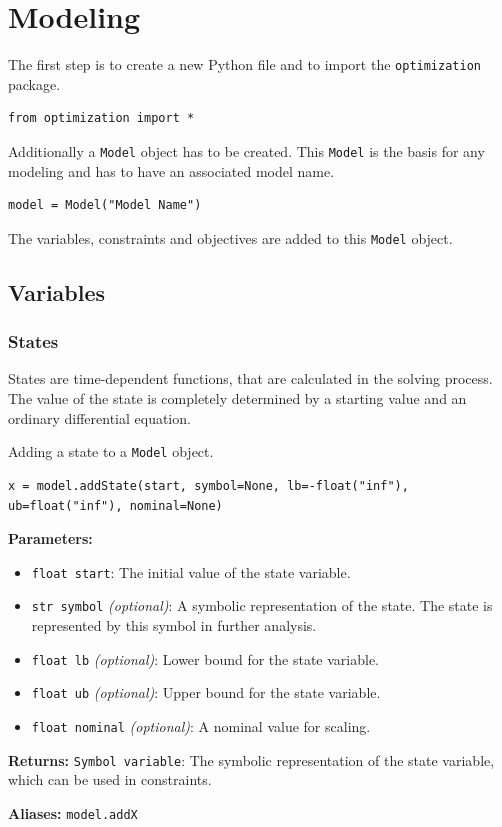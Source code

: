 \documentclass[12pt]{article}
\begin{document}
\section{Modeling}

The first step is to create a new Python file and to import the
\texttt{optimization} package.
\begin{lstlisting}
from optimization import *
	\end{lstlisting}

Additionally a \texttt{Model} object has to be created. This
\texttt{Model} is the basis for any modeling and has to have an associated
model name.
\begin{lstlisting}
model = Model("Model Name")
	\end{lstlisting}

The variables, constraints and objectives are added to this
\texttt{Model} object.

\subsection{Variables}

\subsubsection{States}

States are time-dependent functions, that are calculated in the
solving process. The value of the state is completely determined by a starting
value and an ordinary differential equation.

\begin{mdframed}[backgroundcolor=gray!10, roundcorner=10pt, linewidth=1pt]

	Adding a state to a \texttt{Model} object.

	\begin{lstlisting}
x = model.addState(start, symbol=None, lb=-float("inf"), ub=float("inf"), nominal=None)
	\end{lstlisting}\label{addState}

	\textbf{Parameters:}
	\begin{itemize}
		\item \texttt{float start}: The initial value of the state
		      variable.
		\item \texttt{str symbol} \emph{(optional)}: A symbolic
		      representation of the state. The state is
		      represented by this symbol in
		      further analysis.
		\item \texttt{float lb} \emph{(optional)}: Lower bound for the
		      state variable.
		\item \texttt{float ub} \emph{(optional)}: Upper bound for the
		      state variable.
		\item \texttt{float nominal} \emph{(optional)}: A nominal value
		      for scaling.
	\end{itemize}

	\textbf{Returns:}
	\texttt{Symbol variable}: The symbolic representation of the state
	variable, which can be used in constraints.

	\textbf{Aliases:} \texttt{model.addX}
\end{mdframed}
\end{document}
